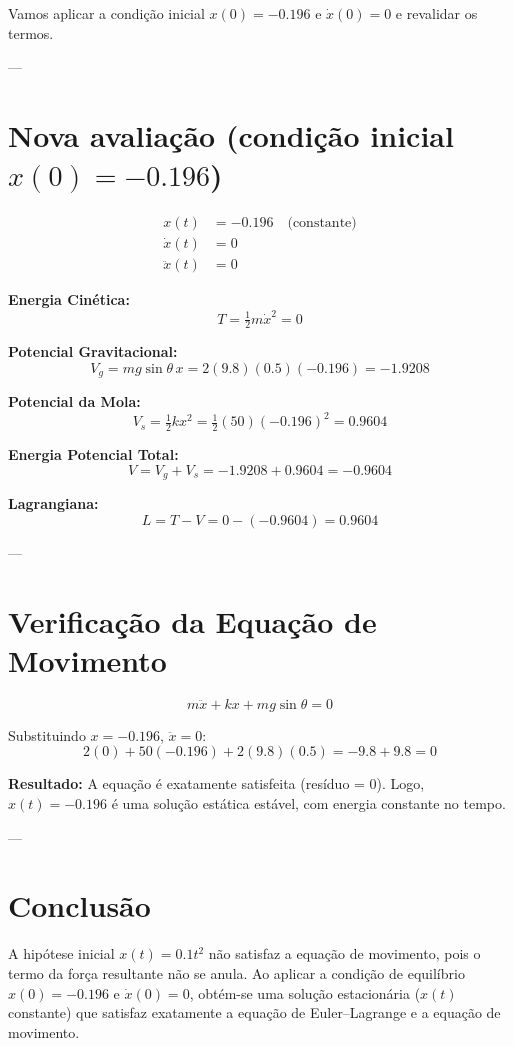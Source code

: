 \documentclass[a4paper,12pt]{article}
\begin{document}
Vamos aplicar a condição inicial $x(0) = -0.196$ e $\dot{x}(0) = 0$ e revalidar os termos.

---

\section*{Nova avaliação (condição inicial $x(0)=-0.196$)}

\begin{align*}
x(t) &= -0.196 \quad \text{(constante)} \\
\dot{x}(t) &= 0 \\
\ddot{x}(t) &= 0
\end{align*}

\textbf{Energia Cinética:}
\[
T = \tfrac{1}{2} m \dot{x}^2 = 0
\]

\textbf{Potencial Gravitacional:}
\[
V_g = m g \sin\theta\, x = 2(9.8)(0.5)(-0.196) = -1.9208
\]

\textbf{Potencial da Mola:}
\[
V_s = \tfrac{1}{2} k x^2 = \tfrac{1}{2}(50)(-0.196)^2 = 0.9604
\]

\textbf{Energia Potencial Total:}
\[
V = V_g + V_s = -1.9208 + 0.9604 = -0.9604
\]

\textbf{Lagrangiana:}
\[
L = T - V = 0 - (-0.9604) = 0.9604
\]

---

\section*{Verificação da Equação de Movimento}

\[
m\ddot{x} + kx + m g \sin\theta = 0
\]

Substituindo $x=-0.196$, $\ddot{x}=0$:
\[
2(0) + 50(-0.196) + 2(9.8)(0.5) = -9.8 + 9.8 = 0
\]

\textbf{Resultado:}  
A equação é exatamente satisfeita (resíduo = 0).  
Logo, $x(t) = -0.196$ é uma solução estática estável, com energia constante no tempo.

---

\section*{Conclusão}

A hipótese inicial $x(t)=0.1t^2$ não satisfaz a equação de movimento, pois o termo da força resultante não se anula.  
Ao aplicar a condição de equilíbrio $x(0)=-0.196$ e $\dot{x}(0)=0$, obtém-se uma solução estacionária ($x(t)$ constante) que satisfaz exatamente a equação de Euler–Lagrange e a equação de movimento.
\end{document}

